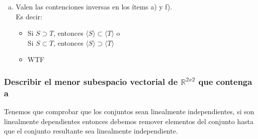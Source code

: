 \documentclass{article}
\begin{document}
\begin{enumerate}[a.]
	\item
		Valen las contenciones inversas en los ítems a) y f). \\
		Es decir: \\
		\begin{itemize}
		\item 
			Si $S \supset T$, entonces $\langle S \rangle \subset \langle T \rangle$ o \\
		 	Si $S \subset T$, entonces $\langle S \rangle \supset \langle T \rangle $
		\item
			WTF
		\end{itemize}
\end{enumerate}
\subsubsection{Describir el menor subespacio vectorial de $\mathbb{R}^{2x2}$ que contenga a}
Tenemos que comprobar que los conjuntos sean linealmente independientes, si son linealmente dependientes entonces
debemos remover elementos del conjunto hasta que el conjunto resultante sea linealmente independiente.
\end{document}
